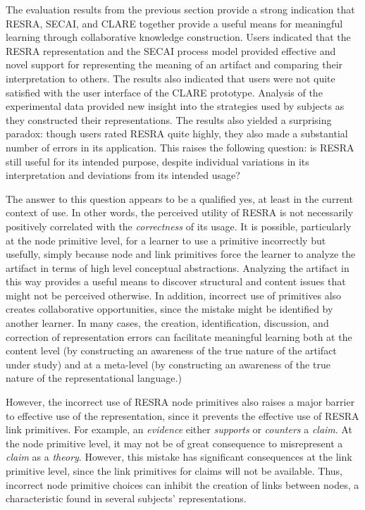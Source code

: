 The evaluation results from the previous section provide a strong
indication that RESRA, SECAI, and CLARE together provide a useful means for
meaningful learning through collaborative knowledge construction.  Users
indicated that the RESRA representation and the SECAI process model
provided effective and novel support for representing the meaning of an
artifact and comparing their interpretation to others. The results also
indicated that users were not quite satisfied with the user interface of
the CLARE prototype. Analysis of the experimental data provided new insight
into the strategies used by subjects as they constructed their
representations. The results also yielded a surprising paradox: though
users rated RESRA quite highly, they also made a substantial number of
errors in its application. This raises the following question: is RESRA
still useful for its intended purpose, despite individual variations in its
interpretation and deviations from its intended usage?

The answer to this question appears to be a qualified yes, at least in the
current context of use. In other words, the perceived utility of RESRA is
not necessarily positively correlated with the {\it correctness\/} of its
usage. It is possible, particularly at the node primitive level, for a
learner to use a primitive incorrectly but usefully, simply because node
and link primitives force the learner to analyze the artifact in terms of
high level conceptual abstractions.  Analyzing the artifact in this way
provides a useful means to discover structural and content issues that
might not be perceived otherwise. In addition, incorrect use of primitives
also creates collaborative opportunities, since the mistake might be
identified by another learner.  In many cases, the creation,
identification, discussion, and correction of representation errors can
facilitate meaningful learning both at the content level (by constructing
an awareness of the true nature of the artifact under study) and at a
meta-level (by constructing an awareness of the true nature of the
representational language.)

However, the incorrect use of RESRA node primitives also raises a major
barrier to effective use of the representation, since it prevents the
effective use of RESRA link primitives. For example, an {\em evidence\/}
either {\it supports\/} or {\it counters} a {\em claim}.  At the node
primitive level, it may not be of great consequence to misrepresent a {\em
claim\/} as a {\it theory\/}.  However, this mistake has significant
consequences at the link primitive level, since the link primitives for
claims will not be available.  Thus, incorrect node primitive choices can
inhibit the creation of links between nodes, a characteristic found in
several subjects' representations.

